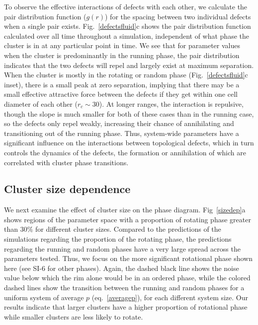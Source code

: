 \documentclass{article}
\begin{document}
To observe the effective interactions of defects with each other, we calculate the pair distribution function ($g(r)$) for the spacing between two individual defects when a single pair exists. Fig.~\ref{defectsfluid}c shows the pair distribution function calculated over all time throughout a simulation, independent of what phase the cluster is in at any particular point in time. We see that for parameter values when the cluster is predominantly in the running phase, the pair distribution indicates that the two defects will repel and largely exist at maximum separation.  When the cluster is mostly in the rotating or random phase (Fig.~\ref{defectsfluid}c inset), there is a small peak at zero separation, implying that there may be a small effective attractive force between the defects if they get within one cell diameter of each other ($r_c\sim30$). At longer ranges, the interaction is repulsive, though the slope is much smaller for both of these cases than in the running case, so the defects only repel weakly, increasing their chance of annihilating and transitioning out of the running phase. Thus, system-wide parameters have a significant influence on the interactions between topological defects, which in turn controls the dynamics of the defects, the formation or annihilation of which are correlated with cluster phase transitions.



\subsection*{Cluster size dependence}

We next examine the effect of cluster size on the phase diagram. Fig~\ref{sizedep}a shows regions of the parameter space with a proportion of rotating phase greater than 30\%  for different cluster sizes.  Compared to the predictions of the simulations regarding the proportion of the rotating phase, the predictions regarding the running and random phases have a very large spread across the parameters tested. Thus, we focus on the more significant rotational phase shown here (see SI-6 for other phases).  Again, the dashed black line shows the noise value below which the rim alone would be in an ordered phase, while the colored dashed lines show the transition between the running and random phases for a uniform system of average $p$ (eq.~\ref{averagep}), for each different system size. Our results indicate that larger clusters have a higher proportion of rotational phase while smaller clusters are less likely to rotate. 
\end{document}
